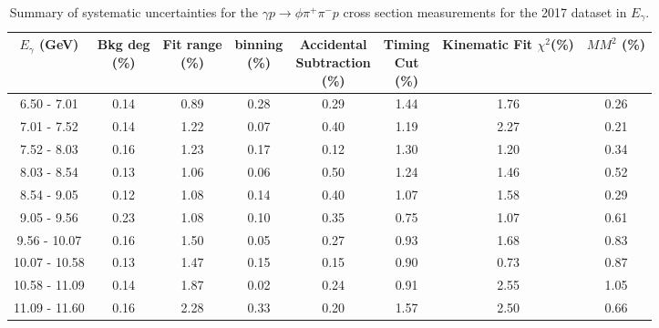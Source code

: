 \begin{table}[!htbp]
    \small
    \centering
    \caption{Summary of systematic uncertainties for the $\gamma p \rightarrow \phi \pi^{+} \pi^{-} p$ cross section measurements for the 2017 dataset in $E_{\gamma}$.}
    \label{tab.syserr.phi2pi.2.1}
    \begin{tabular}{|c|c|c|c|c|c|c|c|}
        \hline
        $E_{\gamma}$ (GeV)&\thead{Bkg deg\\(\%)}&\thead{Fit range\\(\%)}&\thead{binning\\(\%)}&\thead{Accidental\\Subtraction\\(\%)}&\thead{Timing\\Cut\\(\%)}&\thead{Kinematic\\Fit $\chi^{2}$(\%)}&\thead{$MM^{2}$\\(\%)}\\
        \hline
        6.50 - 7.01 & 0.14 & 0.89 & 0.28 & 0.29 & 1.44 & 1.76 & 0.26 \\ 
        7.01 - 7.52 & 0.14 & 1.22 & 0.07 & 0.40 & 1.19 & 2.27 & 0.21 \\ 
        7.52 - 8.03 & 0.16 & 1.23 & 0.17 & 0.12 & 1.30 & 1.20 & 0.34 \\ 
        8.03 - 8.54 & 0.13 & 1.06 & 0.06 & 0.50 & 1.24 & 1.46 & 0.52 \\ 
        8.54 - 9.05 & 0.12 & 1.08 & 0.14 & 0.40 & 1.07 & 1.58 & 0.29 \\ 
        9.05 - 9.56 & 0.23 & 1.08 & 0.10 & 0.35 & 0.75 & 1.07 & 0.61 \\ 
        9.56 - 10.07 & 0.16 & 1.50 & 0.05 & 0.27 & 0.93 & 1.68 & 0.83 \\ 
        10.07 - 10.58 & 0.13 & 1.47 & 0.15 & 0.15 & 0.90 & 0.73 & 0.87 \\ 
        10.58 - 11.09 & 0.14 & 1.87 & 0.02 & 0.24 & 0.91 & 2.55 & 1.05 \\ 
        11.09 - 11.60 & 0.16 & 2.28 & 0.33 & 0.20 & 1.57 & 2.50 & 0.66 \\
        \hline
    \end{tabular}
\end{table}

